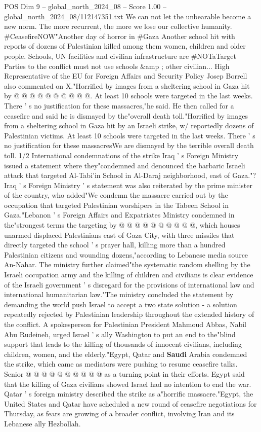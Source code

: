 \begin{textsample}{POS Dim 9 – global\_north\_2024\_08 – Score 1.00 – global\_north\_2024\_08/112147351.txt}
We can not let the unbearable become a new norm.
The more recurrent, the more we lose our collective humanity. \#CeasefireNOW"Another day of horror in \#Gaza Another school hit with reports of dozens of Palestinian killed among them women, children and older people.
Schools, UN facilities and civilian infrastructure are \#NOTaTarget Parties to the conflict must not use schools \&amp ; other civilian...
High Representative of the EU for Foreign Affairs and Security Policy Josep Borrell also commented on X."Horrified by images from a sheltering school in Gaza hit by @ @ @ @ @ @ @ @ @ @.
At least 10 schools were targeted in the last weeks.
There ' s no justification for these massacres,"he said.
He then called for a ceasefire and said he is dismayed by the"overall death toll."Horrified by images from a sheltering school in Gaza hit by an Israeli strike, w/ reportedly dozens of Palestinian victims.
At least 10 schools were targeted in the last weeks.
There ' s no justification for these massacresWe are dismayed by the terrible overall death toll. 1/2 International condemnations of the strike Iraq ' s Foreign Ministry issued a statement where they"condemned and denounced the barbaric Israeli attack that targeted Al-Tabi'in School in Al-Daraj neighborhood, east of Gaza."?
Iraq ' s Foreign Ministry ' s statement was also reiterated by the prime minister of the country, who added"We condemn the massacre carried out by the occupation that targeted Palestinian worshipers in the Tabeen School in Gaza."Lebanon ' s Foreign Affairs and Expatriates Ministry condemned in the"strongest terms the targeting by @ @ @ @ @ @ @ @ @ @, which houses unarmed displaced Palestinians east of Gaza City, with three missiles that directly targeted the school ' s prayer hall, killing more than a hundred Palestinian citizens and wounding dozens,"according to Lebanese media source An-Nahar.
The ministry further claimed"the systematic random shelling by the Israeli occupation army and the killing of children and civilians is clear evidence of the Israeli government ' s disregard for the provisions of international law and international humanitarian law."The ministry concluded the statement by demanding the world push Israel to accept a two state solution - a solution repeatedly rejected by Palestinian leadership throughout the extended history of the conflict.
A spokesperson for Palestinian President Mahmoud Abbas, Nabil Abu Rudeineh, urged Israel ' s ally Washington to put an end to the"blind support that leads to the killing of thousands of innocent civilians, including children, women, and the elderly."Egypt, Qatar and \textbf{Saudi} Arabia condemned the strike, which came as mediators were pushing to resume ceasefire talks.
Senior @ @ @ @ @ @ @ @ @ @ as a turning point in their efforts.
Egypt said that the killing of Gaza civilians showed Israel had no intention to end the war.
Qatar ' s foreign ministry described the strike as a"horrific massacre."Egypt, the United States and Qatar have scheduled a new round of ceasefire negotiations for Thursday, as fears are growing of a broader conflict, involving Iran and its Lebanese ally Hezbollah.

\end{textsample}
